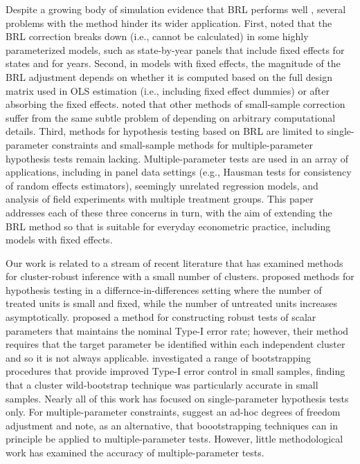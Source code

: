 \documentclass[12pt]{article}\usepackage[]{graphicx}\usepackage[]{color}
\begin{document}
Despite a growing body of simulation evidence that BRL performs well \citep[e.g.,][]{Imbens2012robust}, several problems with the method hinder its wider application. 
First, \citet{Angrist2009mostly} noted that the BRL correction breaks down (i.e., cannot be calculated) in some highly parameterized models, such as state-by-year panels that include fixed effects for states and for years.
Second, in models with fixed effects, the magnitude of the BRL adjustment depends on whether it is computed based on the full design matrix used in OLS estimation (i.e., including fixed effect dummies) or after absorbing the fixed effects. 
\citet{Cameron2015practitioners} noted that other methods of small-sample correction suffer from the same subtle problem of depending on arbitrary computational details.  
Third, methods for hypothesis testing based on BRL are limited to single-parameter constraints \citep{Bell2002bias, McCaffrey2006improved} and small-sample methods for multiple-parameter hypothesis tests remain lacking.
Multiple-parameter tests are used in an array of applications, including in panel data settings (e.g., Hausman tests for consistency of random effects estimators), seemingly unrelated regression models, and analysis of field experiments with multiple treatment groups.
This paper addresses each of these three concerns in turn, with the aim of extending the BRL method so that is suitable for everyday econometric practice, including models with fixed effects. 

Our work is related to a stream of recent literature that has examined methods for cluster-robust inference with a small number of clusters. 
\citet{Conley2011inference} proposed methods for hypothesis testing in a differnce-in-differences setting where the number of treated units is small and fixed, while the number of untreated units increases asymptotically. 
\citet{Ibragimov2010tstatistic} proposed a method for constructing robust tests of scalar parameters that maintains the nominal Type-I error rate; however, their method requires that the target parameter be identified within each independent cluster and so it is not always applicable.  
\citet{Cameron2008bootstrap} investigated a range of bootstrapping procedures that provide improved Type-I error control in small samples, finding that a cluster wild-bootstrap technique was particularly accurate in small samples. 
Nearly all of this work has focused on single-parameter hypothesis tests only. 
For multiple-parameter constraints, \citet{Cameron2015practitioners} suggest an ad-hoc degrees of freedom adjustment and note, as an alternative, that boootstrapping techniques can in principle be applied to multiple-parameter tests. 
However, little methodological work has examined the accuracy of multiple-parameter tests.
\end{document}
